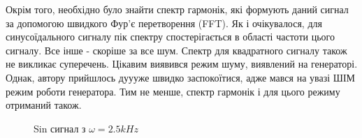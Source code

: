 Окрім того, необхідно було знайти спектр гармонік, які формують даний сигнал за допомогою швидкого Фур'є перетворення (FFT). Як і очікувалося, для синусоїдального сигналу пік спектру спостерігається в області частоти цього сигналу. Все інше - скоріше за все шум. Спектр для квадратного сигналу також не викликає суперечень. Цікавим виявився режим шуму, виявлений на генераторі. Однак, автору прийшлось дуууже швидко заспокоїтися, адже мався на увазі ШІМ режим роботи генератора. Тим не менше, спектр гармонік і для цього режиму отриманий також.
\begin{figure}[h]
	\begin{minipage}[h]{0.47\linewidth}
		 Sin сигнал з $\omega=2.5 kHz$ \\
	\end{minipage}
	\hfill
	\begin{minipage}[h]{0.47\linewidth}

\end{minipage}
\end{figure}
